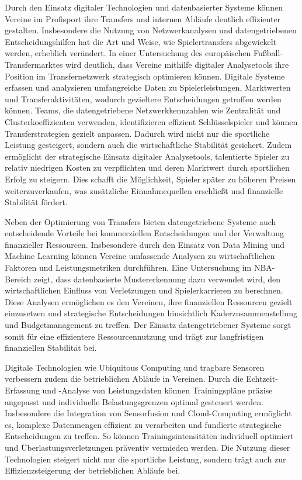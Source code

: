 \documentclass[
  number]{elsarticle}
\begin{document}
Durch den Einsatz digitaler Technologien und datenbasierter Systeme
können Vereine im Profisport ihre Transfers und internen Abläufe
deutlich effizienter gestalten. Insbesondere die Nutzung von
Netzwerkanalysen und datengetriebenen Entscheidungshilfen hat die Art
und Weise, wie Spielertransfers abgewickelt werden, erheblich verändert.
In einer Untersuchung des europäischen Fußball-Transfermarktes wird
deutlich, dass Vereine mithilfe digitaler Analysetools ihre Position im
Transfernetzwerk strategisch optimieren können. Digitale Systeme
erfassen und analysieren umfangreiche Daten zu Spielerleistungen,
Marktwerten und Transferaktivitäten, wodurch gezieltere Entscheidungen
getroffen werden können. Teams, die datengetriebene Netzwerkkennzahlen
wie Zentralität und Clusterkoeffizienten verwenden, identifizieren
effizient Schlüsselspieler und können Transferstrategien gezielt
anpassen. Dadurch wird nicht nur die sportliche Leistung gesteigert,
sondern auch die wirtschaftliche Stabilität gesichert. Zudem ermöglicht
der strategische Einsatz digitaler Analysetools, talentierte Spieler zu
relativ niedrigen Kosten zu verpflichten und deren Marktwert durch
sportlichen Erfolg zu steigern. Dies schafft die Möglichkeit, Spieler
später zu höheren Preisen weiterzuverkaufen, was zusätzliche
Einnahmequellen erschließt und finanzielle Stabilität
fördert\hspace{0pt}. \citep[pp.~1-3]{dieles_transfernetwork}

Neben der Optimierung von Transfers bieten datengetriebene Systeme auch
entscheidende Vorteile bei kommerziellen Entscheidungen und der
Verwaltung finanzieller Ressourcen. Insbesondere durch den Einsatz von
Data Mining und Machine Learning können Vereine umfassende Analysen zu
wirtschaftlichen Faktoren und Leistungsmetriken durchführen. Eine
Untersuchung im NBA-Bereich zeigt, dass datenbasierte Mustererkennung
dazu verwendet wird, den wirtschaftlichen Einfluss von Verletzungen und
Spielerkarrieren zu berechnen. Diese Analysen ermöglichen es den
Vereinen, ihre finanziellen Ressourcen gezielt einzusetzen und
strategische Entscheidungen hinsichtlich Kaderzusammenstellung und
Budgetmanagement zu treffen. Der Einsatz datengetriebener Systeme sorgt
somit für eine effizientere Ressourcennutzung und trägt zur
langfristigen finanziellen Stabilität bei\hspace{0pt}.
\citep{sarlis_sportsanalytics}

Digitale Technologien wie Ubiquitous Computing und tragbare Sensoren
verbessern zudem die betrieblichen Abläufe in Vereinen. Durch die
Echtzeit-Erfassung und -Analyse von Leistungsdaten können Trainingspläne
präzise angepasst und individuelle Belastungsgrenzen optimal gesteuert
werden. Insbesondere die Integration von Sensorfusion und
Cloud-Computing ermöglicht es, komplexe Datenmengen effizient zu
verarbeiten und fundierte strategische Entscheidungen zu treffen. So
können Trainingsintensitäten individuell optimiert und
Überlastungsverletzungen präventiv vermieden werden. Die Nutzung dieser
Technologien steigert nicht nur die sportliche Leistung, sondern trägt
auch zur Effizienzsteigerung der betrieblichen Abläufe bei.
\citep{baca_ubiquitous}
\end{document}
